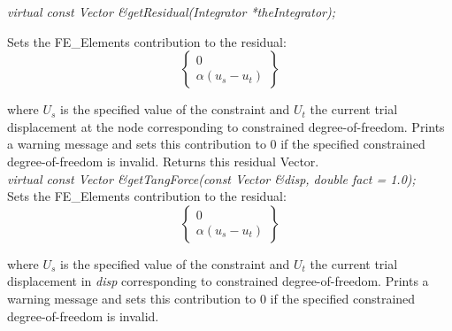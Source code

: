 {\em virtual const Vector \&getResidual(Integrator *theIntegrator);} 

Sets the FE\_Elements contribution to the residual:
$$ \left\{ \begin{array}{c} 0 \\ \alpha(u_s - u_t) \end{array} \right\} $$

where $U_s$ is the specified value of the
constraint and $U_t$ the current trial displacement at the node
corresponding to constrained degree-of-freedom. Prints a warning
message and sets this contribution to $0$ if the specified constrained
degree-of-freedom is invalid. Returns this residual Vector.\\


{\em virtual const Vector \&getTangForce(const Vector \&disp, double
fact = 1.0);    }\\
Sets the FE\_Elements contribution to the residual:
$$ \left\{ \begin{array}{c} 0 \\ \alpha(u_s - u_t) \end{array} \right\} $$

where $U_s$ is the specified value of the
constraint and $U_t$ the current trial displacement in {\em disp}
corresponding to constrained degree-of-freedom. Prints a warning
message and sets this contribution to $0$ if the specified constrained
degree-of-freedom is invalid. \\ 










